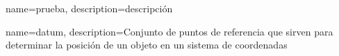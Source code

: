 
{
    name=prueba,
    description={descripción}
}

{
    name=datum,
    description={Conjunto de puntos de referencia que sirven para determinar la posición de un objeto en un sistema de coordenadas}
}
